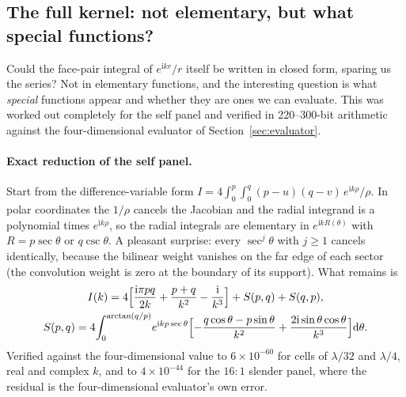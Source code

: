 \documentclass[11pt]{article}
\theoremstyle{remark}
\newcommand{\dd}{\mathrm{d}}
\newcommand{\ii}{\mathrm{i}}
\begin{document}
\subsection{The full kernel: not elementary, but what special functions?}
\label{sec:special}

Could the face-pair integral of $e^{\ii kr}/r$ itself be written in closed form, sparing
us the series? Not in elementary functions, and the interesting question is what
\emph{special} functions appear and whether they are ones we can evaluate. This was
worked out completely for the self panel and verified in 220--300-bit arithmetic
against the four-dimensional evaluator of Section~\ref{sec:evaluator}.

\paragraph{Exact reduction of the self panel.} Start from the difference-variable
form $I = 4\int_0^p\!\int_0^q (p-u)(q-v)\,e^{\ii k\rho}/\rho$. In polar coordinates the
$1/\rho$ cancels the Jacobian and the radial integrand is a polynomial times
$e^{\ii k\rho}$, so the radial integrals are elementary in $e^{\ii k R(\theta)}$ with
$R = p\sec\theta$ or $q\csc\theta$. A pleasant surprise: every $\sec^j\theta$ with
$j\ge 1$ cancels identically, because the bilinear weight vanishes on the far edge of
each sector (the convolution weight is zero at the boundary of its support). What
remains is
\begin{gather}
I(k) = 4\Bigl[\frac{\ii\pi pq}{2k} + \frac{p+q}{k^2} - \frac{\ii}{k^3}\Bigr] + S(p,q) + S(q,p),
\label{eq:selfexact}\\
S(p,q) = 4\!\int_0^{\arctan(q/p)}\! e^{\ii kp\sec\theta}\Bigl[-\frac{q\cos\theta - p\sin\theta}{k^2} + \frac{2\ii\sin\theta\cos\theta}{k^3}\Bigr]\dd\theta .
\end{gather}
Verified against the four-dimensional value to $6\times10^{-60}$ for cells of $\lambda/32$
and $\lambda/4$, real and complex $k$, and to $4\times10^{-44}$ for the $16{:}1$ slender
panel, where the residual is the four-dimensional evaluator's own error.
\end{document}
